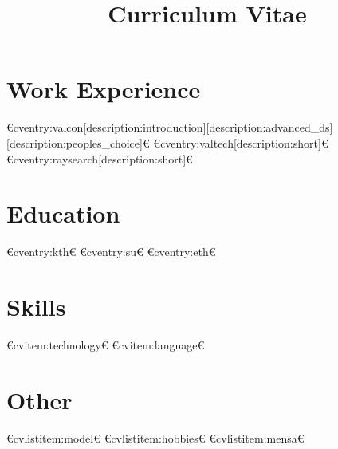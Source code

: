 
\title{Curriculum Vitae}



\geometry{
  left=20 mm,
  right=20 mm,
  top=12 mm,
  bottom=0 mm,
}

\newcommand{\role}{Field Solutions Architect}
\newcommand{\company}{Google}



  \makecvtitle
  

  \section{Work Experience}
  €cventry:valcon[description:introduction][description:advanced_ds][description:peoples_choice]€
  €cventry:valtech[description:short]€
  €cventry:raysearch[description:short]€

  \section{Education}
  €cventry:kth€
  €cventry:su€
  €cventry:eth€

  \section{Skills}
  €cvitem:technology€
  €cvitem:language€

  \section{Other}
  €cvlistitem:model€
  €cvlistitem:hobbies€
  €cvlistitem:mensa€


